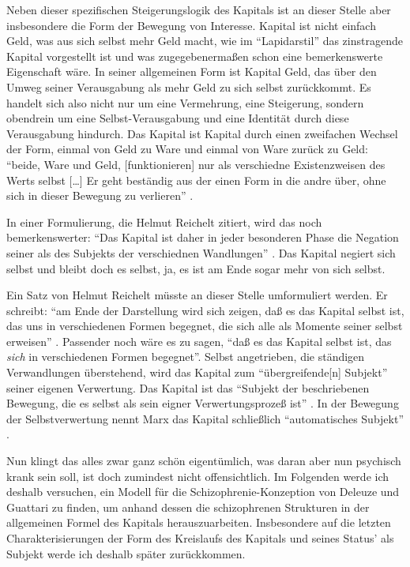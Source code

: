 \documentclass[12pt,
               DIV13,
               paper=a4,
               twoside=false,
               onehalfspacing,
               bibliography=totoc,
               toc=graduated,
               draft,
               ]{scrartcl}
\newcommand{\lips}{\dots\unkern}
\newcommand{\pc}[2]{\parencite[#1]{#2}}
\newcommand{\zn}[3]{\parencite[#1, zit. nach][#2]{#3}}
\newcommand{\dg}{Deleuze und Guattari\xspace}
\begin{document}
Neben dieser spezifischen Steigerungslogik des Kapitals ist an dieser
Stelle aber insbesondere die Form der Bewegung von Interesse. Kapital
ist nicht einfach Geld, was aus sich selbst mehr Geld macht, wie im
"`Lapidarstil"' \pc{170}{kap} das zinstragende Kapital vorgestellt ist
und was zugegebenermaßen schon eine bemerkenswerte Eigenschaft wäre.
In seiner allgemeinen Form ist Kapital Geld, das über den Umweg seiner
Verausgabung als mehr Geld zu sich selbst zurückkommt. Es handelt sich
also nicht nur um eine Vermehrung, eine Steigerung, sondern obendrein
um eine Selbst-Verausgabung und eine Identität durch diese
Verausgabung hindurch. Das Kapital ist Kapital durch einen zweifachen
Wechsel der Form, einmal von Geld zu Ware und einmal von Ware zurück
zu Geld: "`beide, Ware und Geld, [funktionieren] nur als verschiedne
Existenzweisen des Werts selbst [\lips] Er geht beständig aus der
einen Form in die andre über, ohne sich in dieser Bewegung zu
verlieren"' \pc{S. 168 f.}{kap}.

In einer Formulierung, die Helmut Reichelt zitiert, wird das noch
bemerkenswerter: "`Das Kapital ist daher in jeder besonderen Phase die
Negation seiner als des Subjekts der verschiednen Wandlungen"'
\zn{Marx}{181}{reichelt}. Das Kapital negiert sich selbst und bleibt
doch es selbst, ja, es ist am Ende sogar mehr von sich selbst.


Ein Satz von Helmut Reichelt müsste an dieser Stelle umformuliert
werden. Er schreibt: "`am Ende der Darstellung wird sich zeigen, daß es
das Kapital selbst ist, das uns in verschiedenen Formen begegnet, die
sich alle als Momente seiner selbst erweisen"' \pc{181}{reichelt}.
Passender noch wäre es zu sagen, "`daß es das Kapital selbst ist, das
\emph{sich} in verschiedenen Formen begegnet"'. Selbst angetrieben,
die ständigen Verwandlungen überstehend, wird das Kapital zum
"`übergreifende[n] Subjekt"' \pc{169}{kap} seiner eigenen Verwertung.
Das Kapital ist das "`Subjekt der beschriebenen Bewegung, die es
selbst als sein eigner Verwertungsprozeß ist"'
\zn{Marx}{181}{reichelt}. In der Bewegung der Selbstverwertung nennt
Marx das Kapital schließlich "`automatisches Subjekt"' \pc{169}{kap}.

Nun klingt das alles zwar ganz schön eigentümlich, was daran aber nun
psychisch krank sein soll, ist doch zumindest nicht offensichtlich. Im
Folgenden werde ich deshalb versuchen, ein Modell für die
Schizophrenie-Konzeption von \dg zu finden, um anhand dessen die
schizophrenen Strukturen in der allgemeinen Formel des Kapitals
herauszuarbeiten. Insbesondere auf die letzten Charakterisierungen der
Form des Kreislaufs des Kapitals und seines Status' als Subjekt
werde ich deshalb später zurückkommen.
\end{document}
